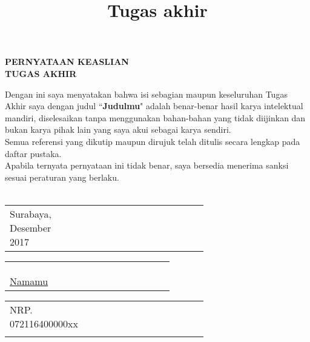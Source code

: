 \documentclass[a5paper, 10pt, twoside, bahasa]{report}
\title{Tugas akhir}
\begin{document}
\begin{center}
\Large\textbf{PERNYATAAN KEASLIAN\\}
\Large\textbf{TUGAS AKHIR}
\vspace{1ex}
\end{center}

\setlength{\parindent}{1cm} Dengan ini saya menyatakan bahwa isi sebagian maupun keseluruhan Tugas Akhir saya dengan judul ``\textbf{Judulmu}" adalah benar-benar hasil karya intelektual mandiri, diselesaikan tanpa menggunakan bahan-bahan yang tidak diijinkan dan bukan karya pihak lain yang saya akui sebagai karya sendiri.
\\

\setlength{\parindent}{1cm} Semua referensi yang dikutip maupun dirujuk telah ditulis secara lengkap pada daftar pustaka. 
\\

\setlength{\parindent}{1cm} Apabila ternyata pernyataan ini tidak benar, saya bersedia menerima sanksi sesuai peraturan yang berlaku.
\\
\\

\begin{adjustwidth}{6cm}{}
\begin{tabular}{lcp{0.65\linewidth}}
\centering Surabaya, Desember 2017 & & \\
\end{tabular}
\end{adjustwidth}

\begin{adjustwidth}{5.63cm}{}
\begin{tabular}{lcp{0.65\linewidth}}
\\
\\
\\
\\
\centering \underline{Namamu} & & \\
\end{tabular}
\end{adjustwidth}

\begin{adjustwidth}{6.15cm}{}
\begin{tabular}{lcp{0.65\linewidth}}
\centering NRP. 072116400000xx & & \\ & & \\
\end{tabular}
\end{adjustwidth}
\end{document}
